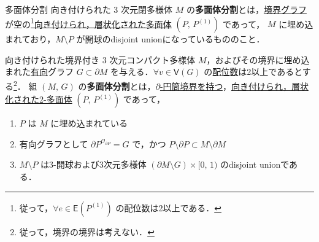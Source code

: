 \documentclass[TQFT_main]{subfiles}
\begin{document}
\begin{mydef}[label=def:polytope-decomp]{多面体分割}
    向き付けられた $3$ 次元閉多様体 $M$ の\textbf{多面体分割}とは，\hyperref[def:graph-bdy]{境界グラフ}が空の\footnote{従って，$\forall e \in \mathsf{E}(P^{(1)})$ の配位数は2以上である．}\hyperref[def:polyhedron]{向き付けられ，層状化された多面体} $(P,\, P^{(1)})$ であって，
    $M$ に埋め込まれており，$M \setminus P$ が開球のdisjoint unionになっているもののこと． 
    
    \tcblower

    向き付けられた境界付き $3$ 次元コンパクト多様体 $M$，およびその境界に埋め込まれた\underline{有向}グラフ $G \subset \partial M$ を与える．$\forall v \in \mathsf{V}(G)$ の\hyperref[def:polyhedron]{配位数}は2以上であるとする\footnote{従って，境界の境界は考えない．}．
    組 $(M,\, G)$ の\textbf{多面体分割}とは，\hyperref[def:graph-bdy]{$\partial$-円筒境界を持つ}，\hyperref[def:polyhedron]{向き付けられ，層状化された2-多面体} $(P,\, P^{(1)})$ であって，
    \begin{enumerate}
        \item $P$ は $M$ に埋め込まれている
        \item 有向グラフとして $\partial P^{\mathcal{O}_{\partial P}} = G$ で，かつ $P \setminus \partial P \subset M \setminus \partial M$
        \item $M \setminus P$ は3-開球および3次元多様体 $(\partial M \setminus G) \times [0,\, 1)$ のdisjoint unionである．
    \end{enumerate}
    
\end{mydef}
\end{document}
